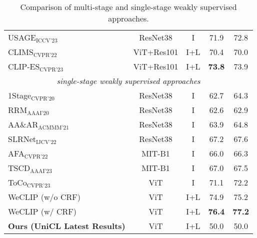 \begin{table}[ht]
\begin{tabular}{l c c c c}
        USAGE$_{\text{ICCV'23}}$~\cite{wsss_usage}    & ResNet38   & I    & 71.9          & 72.8          \\
        CLIMS$_{\text{CVPR'22}}$~\cite{wsss_clims}    & ViT+Res101 & I+L  & 70.4          & 70.0          \\
        CLIP-ES$_{\text{CVPR'23}}$~\cite{wsss_clip_es}                       & ViT+Res101 & I+L  & \textbf{73.8} & 73.9          \\
        \hline
        \multicolumn{5}{c}{\textit{single-stage weakly supervised approaches}}                                                   \\
        1Stage$_{\text{CVPR'20}}$~\cite{wsss_single_stage}                   & ResNet38   & I    & 62.7          & 64.3          \\
        RRM$_{\text{AAAI'20}}$~\cite{wsss_reliability_does_matter}           & ResNet38   & I    & 62.6          & 62.9          \\
        AA\&AR$_{\text{ACMMM'21}}$~\cite{wsss_aaar}                                 & ResNet38   & I    & 63.9          & 64.8          \\
        SLRNet$_{\text{IJCV'22}}$~\cite{wsss_slr_net}                                  & ResNet38   & I    & 67.2          & 67.6          \\
        AFA$_{\text{CVPR'22}}$~\cite{wsss_afa_affinity_from_attention}                                     & MIT-B1     & I    & 66.0          & 66.3          \\
        TSCD$_{\text{AAAI'23}}$~\cite{wsss_tscd}                                    & MIT-B1     & I    & 67.0          & 67.5          \\
        ToCo$_{\text{CVPR'23}}$~\cite{wsss_toco_token_contrast}                                    & ViT        & I    & 71.1          & 72.2          \\
        WeCLIP (w/o CRF)                                                & ViT        & I+L  & 74.9          & 75.2          \\
        WeCLIP (w/ CRF)                                                 & ViT        & I+L  & \textbf{76.4} & \textbf{77.2} \\
        \hline
        \textbf{Ours (UniCL Latest Results)} & ViT & I+L & 50.0 & 50.0 \\
        \hline
    \end{tabular}
    \caption{Comparison of multi-stage and single-stage weakly supervised approaches.}
    \label{tab:quantitative_results}
\end{table}
